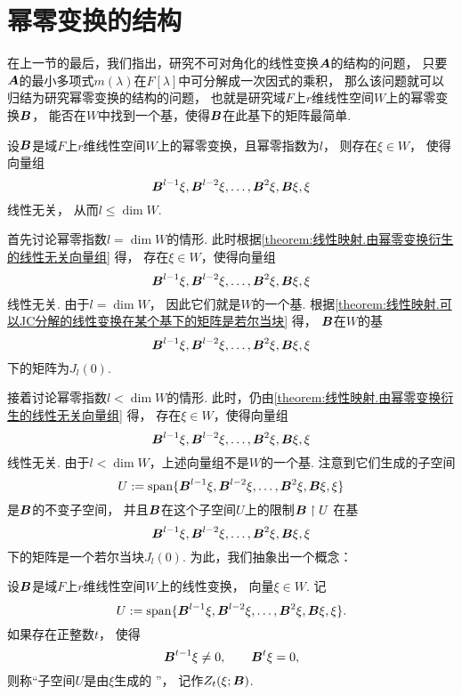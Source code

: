 \section{幂零变换的结构}
在上一节的最后，我们指出，研究不可对角化的线性变换\(\boldsymbol{A}\)的结构的问题，
只要\(\boldsymbol{A}\)的最小多项式\(m(\lambda)\)在\(F[\lambda]\)中可分解成一次因式的乘积，
那么该问题就可以归结为研究幂零变换的结构的问题，
也就是研究域\(F\)上\(r\)维线性空间\(W\)上的幂零变换\(\boldsymbol{B}\)，
能否在\(W\)中找到一个基，使得\(\boldsymbol{B}\)在此基下的矩阵最简单.

\begin{proposition}\label{theorem:线性映射.由幂零变换衍生的线性无关向量组}
设\(\boldsymbol{B}\)是域\(F\)上\(r\)维线性空间\(W\)上的幂零变换，且幂零指数为\(l\)，
则存在\(\xi \in W\)，
使得向量组\begin{equation*}
	\boldsymbol{B}^{l-1}\xi,
	\boldsymbol{B}^{l-2}\xi,
	\dotsc,
	\boldsymbol{B}^2\xi,
	\boldsymbol{B}\xi,
	\xi
\end{equation*}线性无关，
从而\(l \leq \dim W\).
\end{proposition}

\def\BasisL{\vb{B}^{l-1}\xi,\vb{B}^{l-2}\xi,\dotsc,\vb{B}^2\xi,\vb{B}\xi,\xi}
首先讨论幂零指数\(l = \dim W\)的情形.
此时根据\cref{theorem:线性映射.由幂零变换衍生的线性无关向量组} 得，
存在\(\xi \in W\)，使得向量组\begin{equation*}
	\BasisL
\end{equation*}线性无关.
由于\(l = \dim W\)，
因此它们就是\(W\)的一个基.
根据\cref{theorem:线性映射.可以JC分解的线性变换在某个基下的矩阵是若尔当块} 得，
\(\boldsymbol{B}\)在\(W\)的基\begin{equation*}
	\BasisL
\end{equation*}下的矩阵为\(J_l(0)\).

接着讨论幂零指数\(l < \dim W\)的情形.
此时，仍由\cref{theorem:线性映射.由幂零变换衍生的线性无关向量组} 得，
存在\(\xi \in W\)，使得向量组\begin{equation*}
	\BasisL
\end{equation*}线性无关.
由于\(l < \dim W\)，上述向量组不是\(W\)的一个基.
注意到它们生成的子空间\begin{equation*}
	U \defeq \Span\{\BasisL\}
\end{equation*}是\(\boldsymbol{B}\)的不变子空间，
并且\(\boldsymbol{B}\)在这个子空间\(U\)上的限制\(\boldsymbol{B} \upharpoonright U\)
在基\begin{equation*}
	\BasisL
\end{equation*}下的矩阵是一个若尔当块\(J_l(0)\).
为此，我们抽象出一个概念：
\begin{definition}\label{definition:线性映射.生成强循环子空间}
设\(\boldsymbol{B}\)是域\(F\)上\(r\)维线性空间\(W\)上的线性变换，
向量\(\xi \in W\).
记\begin{equation*}
	U \defeq \Span\{\BasisL\}.
\end{equation*}
如果存在正整数\(t\)，
使得\begin{equation*}
	\boldsymbol{B}^{t-1} \xi \neq 0,
	\qquad
	\boldsymbol{B}^t \xi = 0,
\end{equation*}
则称“子空间\(U\)是由\(\xi\)生成的 ”，
记作\(Z_t(\xi;\boldsymbol{B})\).
\end{definition}

